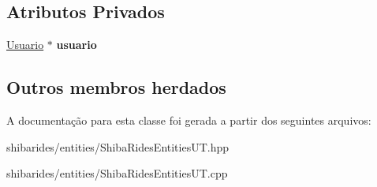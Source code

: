 \subsection*{Atributos Privados}
\begin{DoxyCompactItemize}
\item 
\hyperlink{classshibarides_1_1Usuario}{Usuario} $\ast$ {\bfseries usuario}\hypertarget{classshibarides_1_1TUUsuario_af6ceda9a74b6bc5735c6c635eca43573}{}\label{classshibarides_1_1TUUsuario_af6ceda9a74b6bc5735c6c635eca43573}

\end{DoxyCompactItemize}
\subsection*{Outros membros herdados}


A documentação para esta classe foi gerada a partir dos seguintes arquivos\+:\begin{DoxyCompactItemize}
\item 
shibarides/entities/Shiba\+Rides\+Entities\+U\+T.\+hpp\item 
shibarides/entities/Shiba\+Rides\+Entities\+U\+T.\+cpp\end{DoxyCompactItemize}
